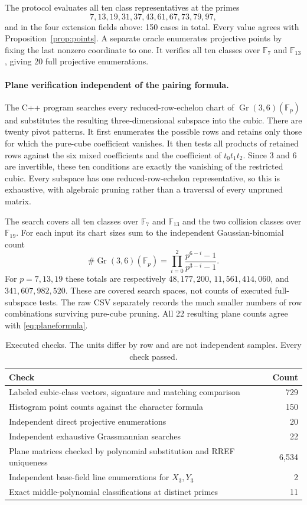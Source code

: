 \documentclass[11pt]{article}
\theoremstyle{remark}\newtheorem{remark}[theorem]{Remark}
\newcommand{\F}{\mathbb F}\newcommand{\PP}{\mathbb P}\newcommand{\Z}{\mathbb Z}
\begin{document}
The protocol evaluates all ten class representatives at the primes
\[
7,13,19,31,37,43,61,67,73,79,97,
\]
and in the four extension fields above: 150 cases in total. Every value agrees with Proposition~\ref{prop:points}. A separate oracle enumerates projective points by fixing the last nonzero coordinate to one. It verifies all ten classes over $\F_7$ and $\F_{13}$, giving 20 full projective enumerations.

\paragraph{Plane verification independent of the pairing formula.}
The C++ program searches every reduced-row-echelon chart of $\operatorname{Gr}(3,6)(\F_p)$ and substitutes the resulting three-dimensional subspace into the cubic. There are twenty pivot patterns. It first enumerates the possible rows and retains only those for which the pure-cube coefficient vanishes. It then tests all products of retained rows against the six mixed coefficients and the coefficient of $t_0t_1t_2$. Since $3$ and $6$ are invertible, these ten conditions are exactly the vanishing of the restricted cubic. Every subspace has one reduced-row-echelon representative, so this is exhaustive, with algebraic pruning rather than a traversal of every unpruned matrix.

The search covers all ten classes over $\F_7$ and $\F_{13}$ and the two collision classes over $\F_{19}$. For each input its chart sizes sum to the independent Gaussian-binomial count
\[
\#\operatorname{Gr}(3,6)(\F_p)=
\prod_{i=0}^2\frac{p^{6-i}-1}{p^{3-i}-1}.
\]
For $p=7,13,19$ these totals are respectively $48{,}177{,}200$, $11{,}561{,}414{,}060$, and $341{,}607{,}982{,}520$. These are covered search spaces, not counts of executed full-subspace tests. The raw CSV separately records the much smaller numbers of row combinations surviving pure-cube pruning. All 22 resulting plane counts agree with \eqref{eq:planeformula}.

\begin{table}[ht]\centering
\caption{Executed checks. The units differ by row and are not independent samples. Every check passed.}\label{tab:checks}
\begin{tabular}{lr}\toprule
Check&Count\\\midrule
Labeled cubic-class vectors, signature and matching comparison&729\\
Histogram point counts against the character formula&150\\
Independent direct projective enumerations&20\\
Independent exhaustive Grassmannian searches&22\\
Plane matrices checked by polynomial substitution and RREF uniqueness&6,534\\
Independent base-field line enumerations for $X_3,Y_3$&2\\
Exact middle-polynomial classifications at distinct primes&11\\\bottomrule
\end{tabular}
\end{table}
\end{document}
